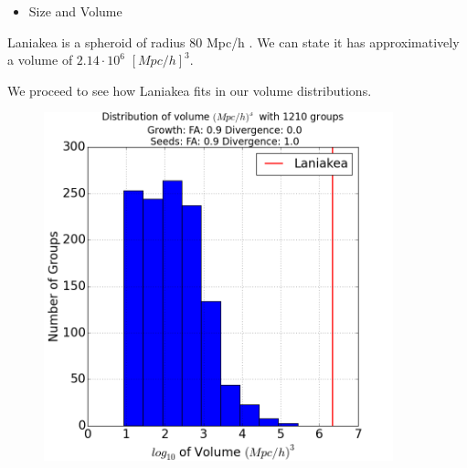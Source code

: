 \documentclass[12pt]{article}
\begin{document}
\begin{itemize}
\item Size and Volume
\end{itemize}
\begin{par}
Laniakea is a spheroid of radius 80 Mpc/h \cite{tully_laniakea_2014}. We can state it has approximatively a volume of $2.14 \cdot 10^6$ $\left[ Mpc/h \right]^3$.\\
\end{par}
\begin{par}
We proceed to see how Laniakea fits in our volume distributions.
\end{par}

\begin{figure}[ht]
\centering
\begin{minipage}{.5\textwidth}
  \centering
  \includegraphics[width=0.9\textwidth]{groups/volumeplots/volumes_distr_Mpc_laniakea_09_Trace_10_search_FA_09_Trace_00.png} %
\end{minipage}%
\begin{minipage}{.5\textwidth}
  \centering

\end{minipage}
\end{figure}
\end{document}
